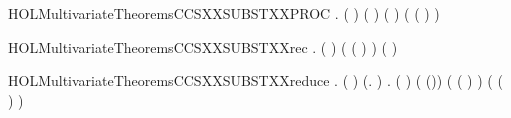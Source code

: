 \newcommand{\HOLMultivariateTheoremsCCSXXSUBSTXXprefix}{\UseVerbatim{HOLMultivariateTheoremsCCSXXSUBSTXXprefix}}
\begin{SaveVerbatim}{HOLMultivariateTheoremsCCSXXSUBSTXXPROC}
\HOLTokenTurnstile{} \HOLSymConst{\HOLTokenForall{}}  .
       (  \HOLSymConst{=}  ) \HOLSymConst{\HOLTokenConj{}}  ( ) ( ) \HOLSymConst{\HOLTokenConj{}}
         \HOLSymConst{\HOLTokenImp{}}
       ( ( \HOLSymConst{\HOLTokenMapto{}} )  \HOLSymConst{=} )
\end{SaveVerbatim}
\newcommand{\HOLMultivariateTheoremsCCSXXSUBSTXXPROC}{\UseVerbatim{HOLMultivariateTheoremsCCSXXSUBSTXXPROC}}
\begin{SaveVerbatim}{HOLMultivariateTheoremsCCSXXSUBSTXXrec}
\HOLTokenTurnstile{} \HOLSymConst{\HOLTokenForall{}}  .
         (\HOLConst{\ensuremath{\mu}}  ) \HOLSymConst{=}
         \HOLConst{\HOLTokenIn{}}    \HOLConst{\ensuremath{\mu}}  ( ( \HOLSymConst{\HOLTokenBackslash{}\HOLTokenBackslash{}} ) )
        \HOLConst{\ensuremath{\mu}}  (  )
\end{SaveVerbatim}
\newcommand{\HOLMultivariateTheoremsCCSXXSUBSTXXrec}{\UseVerbatim{HOLMultivariateTheoremsCCSXXSUBSTXXrec}}
\begin{SaveVerbatim}{HOLMultivariateTheoremsCCSXXSUBSTXXreduce}
\HOLTokenTurnstile{} \HOLSymConst{\HOLTokenForall{}}   .
       \HOLSymConst{\HOLTokenNeg{}}   \HOLSymConst{\HOLTokenConj{}}   \HOLSymConst{\HOLTokenConj{}} (  \HOLSymConst{=}  ) \HOLSymConst{\HOLTokenConj{}}
        (\HOLTokenLambda{}.  \HOLConst{\HOLTokenNotIn{}}  )  \HOLSymConst{\HOLTokenImp{}}
       \HOLSymConst{\HOLTokenForall{}} .
            ( ) ( (\HOLSymConst{::})) \HOLSymConst{\HOLTokenConj{}}
           ( ( \HOLSymConst{\HOLTokenMapto{}} )  \HOLSymConst{=} ) \HOLSymConst{\HOLTokenImp{}}
           ( (\HOLSymConst{::} \HOLSymConst{\HOLTokenMapto{}} \HOLSymConst{::})  \HOLSymConst{=}    )
\end{SaveVerbatim}
